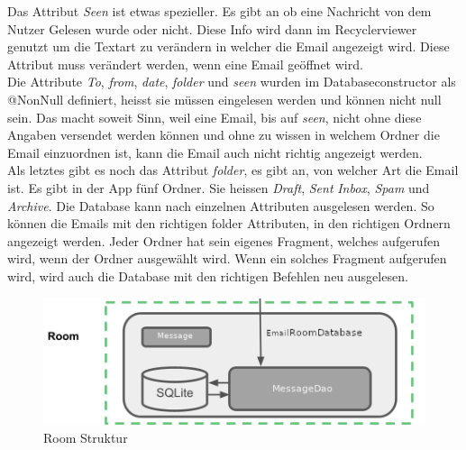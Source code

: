 \documentclass[a4paper,11pt]{article}
\begin{document}
Das Attribut \textit{Seen} ist etwas spezieller. Es gibt an ob eine Nachricht von dem Nutzer Gelesen wurde oder nicht. Diese Info wird dann im Recyclerviewer genutzt um die Textart zu verändern
in welcher die Email angezeigt wird. Diese Attribut muss verändert werden, wenn eine Email geöffnet wird. \\

Die Attribute \textit{To}, \textit{from}, \textit{date}, \textit{folder} und \textit{seen} wurden im Databaseconstructor als @NonNull definiert, heisst sie müssen eingelesen werden und können 
nicht null sein. Das macht soweit Sinn, weil eine Email, bis auf \textit{seen}, nicht ohne diese Angaben versendet werden können und ohne zu wissen in welchem Ordner die Email einzuordnen ist,
kann die Email auch nicht richtig angezeigt werden. \\

Als letztes gibt es noch das Attribut \textit{folder}, es gibt an, von welcher Art die Email ist. Es gibt in der App fünf Ordner. Sie heissen \textit{Draft}, \textit{Sent} 
\textit{Inbox}, \textit{Spam} und \textit{Archive}. Die Database kann nach einzelnen Attributen ausgelesen werden. So können die Emails mit den richtigen
folder Attributen, in den richtigen Ordnern angezeigt werden. Jeder Ordner hat sein eigenes Fragment, welches aufgerufen wird, wenn der Ordner ausgewählt wird.
Wenn ein solches Fragment aufgerufen wird, wird auch die Database mit den richtigen Befehlen neu ausgelesen.  \\





\begingroup
\setlength{\intextsep}{10pt}
\setlength{\columnsep}{15pt}

\begin{figure}
    \centering
    \includegraphics[width=.4\textwidth]{media/RoomStructure.png}
    \caption{Room Struktur \cite{appStructurePicture}}
\end{figure}
\end{document}
